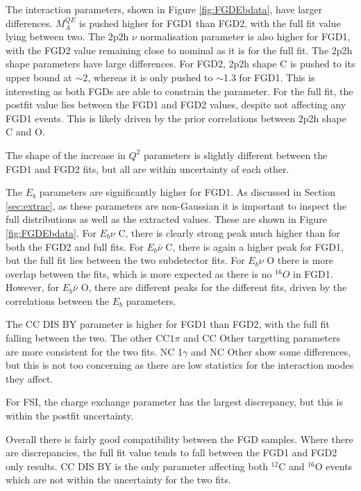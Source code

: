 The interaction parameters, shown in Figure \ref{fig:FGDEbdata}, have larger differences. $M_{A}^{QE}$ is pushed higher for FGD1 than FGD2, with the full fit value lying between two. The 2p2h $\nu$ normalisation parameter is also higher for FGD1, with the FGD2 value remaining close to nominal as it is for the full fit. The 2p2h shape parameters have large differences. For FGD2, 2p2h shape C is pushed to its upper bound at $\sim$2, whereas it is only pushed to $\sim$1.3 for FGD1. This is interesting as both FGDs are able to constrain the parameter. For the full fit, the postfit value lies between the FGD1 and FGD2 values, despite not affecting any FGD1 events. This is likely driven by the prior correlations between 2p2h shape C and O.

The shape of the increase in $Q^2$ parameters is slightly different between the FGD1 and FGD2 fits, but all are within uncertainty of each other.

The $E_b$ parameters are significantly higher for FGD1. As discussed in Section \ref{sec:extrac}, as these parameters are non-Gaussian it is important to inspect the full distributions as well as the extracted values. These are shown in Figure \ref{fig:FGDEbdata}. For $E_b \nu$ C, there is clearly strong peak much higher than for both the FGD2 and full fits. For $E_b \bar{\nu}$ C, there is again a higher peak for FGD1, but the full fit lies between the two subdetector fits. For $E_b \nu$ O there is more overlap between the fits, which is more expected as there is no $^{16}O$ in FGD1. However, for $E_b \bar{\nu}$ O, there are different peaks for the different fits, driven by the correlations between the $E_b$ parameters.

The CC DIS BY parameter is higher for FGD1 than FGD2, with the full fit falling between the two. The other CC$ 1\pi$ and CC Other targetting parameters are more consistent for the two fits. NC 1$\gamma$ and NC Other show some differences, but this is not too concerning as there are low statistics for the interaction modes they affect.

For FSI, the charge exchange parameter has the largest discrepancy, but this is within the postfit uncertainty.

Overall there is fairly good compatibility between the FGD samples. Where there are discrepancies, the full fit value tends to fall between the FGD1 and FGD2 only results. CC DIS BY is the only parameter affecting both $^{12}$C and $^{16}$O events which are not within the uncertainty for the two fits. 

